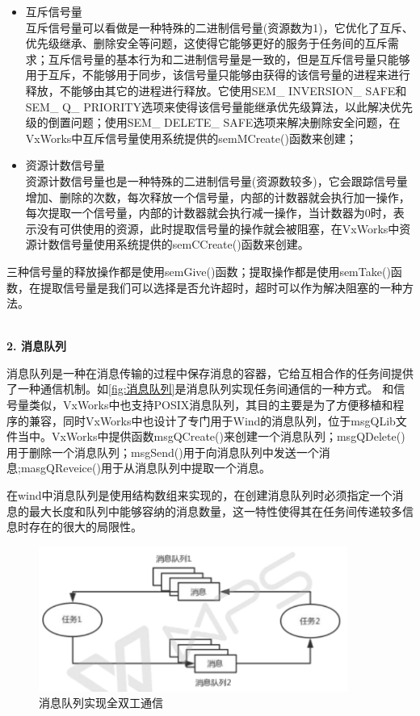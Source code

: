 \begin{itemize}
\item 互斥信号量\\
	互斥信号量可以看做是一种特殊的二进制信号量(资源数为1)，它优化了互斥、优先级继承、删除安全等问题，这使得它能够更好的服务于任务间的互斥需求；互斥信号量的基本行为和二进制信号量是一致的，但是互斥信号量只能够用于互斥，不能够用于同步，该信号量只能够由获得的该信号量的进程来进行释放，不能够由其它的进程进行释放。它使用SEM\_ INVERSION\_ SAFE和SEM\_ Q\_ PRIORITY选项来使得该信号量能继承优先级算法，以此解决优先级的倒置问题；使用SEM\_ DELETE\_ SAFE选项来解决删除安全问题，在VxWorks中互斥信号量使用系统提供的semMCreate()函数来创建；
	
\item 资源计数信号量\\
	资源计数信号量也是一种特殊的二进制信号量(资源数较多)，它会跟踪信号量增加、删除的次数，每次释放一个信号量，内部的计数器就会执行加一操作，每次提取一个信号量，内部的计数器就会执行减一操作，当计数器为0时，表示没有可供使用的资源，此时提取信号量的操作就会被阻塞，在VxWorks中资源计数信号量使用系统提供的semCCreate()函数来创建。

\end{itemize}
	
三种信号量的释放操作都是使用semGive()函数；提取操作都是使用semTake()函数，在提取信号量是我们可以选择是否允许超时，超时可以作为解决阻塞的一种方法。

	\\
	
\noindent \textbf{2. 消息队列}

	消息队列是一种在消息传输的过程中保存消息的容器，它给互相合作的任务间提供了一种通信机制。如\autoref{fig:消息队列}是消息队列实现任务间通信的一种方式。
	和信号量类似，VxWorks中也支持POSIX消息队列，其目的主要是为了方便移植和程序的兼容，同时VxWorks中也设计了专门用于Wind的消息队列，位于msgQLib文件当中。VxWorks中提供函数msgQCreate()来创建一个消息队列；msgQDelete()用于删除一个消息队列；msgSend()用于向消息队列中发送一个消息;masgQReveice()用于从消息队列中提取一个消息。
	
	在wind中消息队列是使用结构数组来实现的，在创建消息队列时必须指定一个消息的最大长度和队列中能够容纳的消息数量，这一特性使得其在任务间传递较多信息时存在的很大的局限性\cite{冯云贺2014基于}。
	
\begin{figure}[!h]
\centering
\includegraphics[width=0.9\textwidth]{./graphics/messageQueue.pdf}
\caption{消息队列实现全双工通信}\label{fig:消息队列}
\end{figure}	
				


